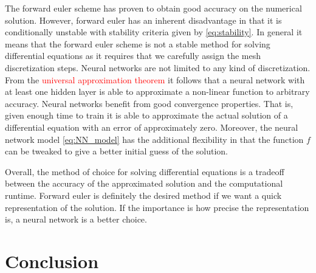 \documentclass[12pt]{extarticle}
\begin{document}
\par The forward euler scheme has proven to obtain good accuracy on the numerical solution. However, forward euler has an inherent disadvantage in that it is conditionally unstable with stability criteria given by \ref{eq:stability}. In general it means that the forward euler scheme is not a stable method for solving differential equations as it requires that we carefully assign the mesh discretization steps. Neural networks are not limited to any kind of discretization. From the \textcolor{red}{universal approximation theorem} it follows that a neural network with at least one hidden layer is able to approximate a non-linear function to arbitrary accuracy. Neural networks benefit from good convergence properties. That is, given enough time to train it is able to approximate the actual solution of a differential equation with an error of approximately zero. Moreover, the neural network model \ref{eq:NN_model} has the additional flexibility in that the function $f$ can be tweaked to give a better initial guess of the solution. 
\par Overall, the method of choice for solving differential equations is a tradeoff between the accuracy of the approximated solution and the computational runtime. Forward euler is definitely the desired method if we want a quick representation of the solution. If the importance is how precise the representation is, a neural network is a better choice.


\section{Conclusion}



\end{document}
